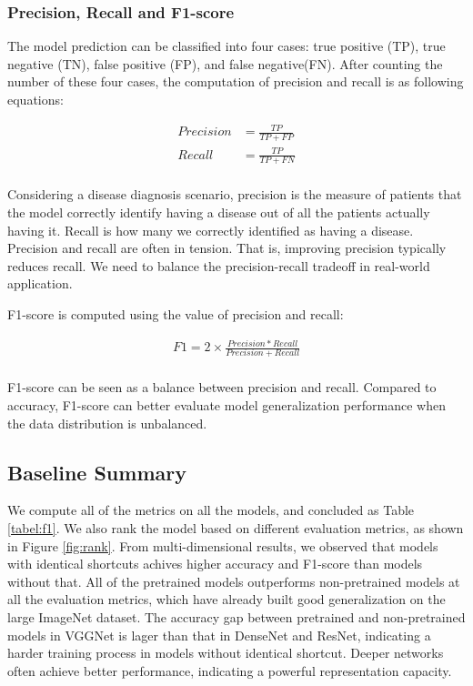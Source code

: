 \subsubsection{Precision, Recall and F1-score}
The model prediction can be classified into four cases: true positive (TP), true negative (TN), false positive (FP), and false negative(FN). After counting the number of these four cases, the computation of precision and recall is as following equations:


\begin{equation*}
  \begin{split}
    Precision & = \frac{TP}{TP+FP}\\
    Recall & = \frac{TP}{TP+FN}\\
  \end{split}
\end{equation*}

Considering a disease diagnosis scenario, precision is the measure of patients that the model correctly identify having a disease out of all the patients actually having it. Recall is how many we correctly identified as having a disease. Precision and recall are often in tension. That is, improving precision typically reduces recall. We need to balance the precision-recall tradeoff in real-world application.

F1-score is computed using the value of precision and recall:


\begin{equation*}
  \begin{split}
    F1 =2\times \frac{Precision  *Recall}{Precision + Recall}\\
  \end{split}
\end{equation*}

F1-score can be seen as a balance between precision and recall. Compared to accuracy, F1-score can better evaluate model generalization performance when the data distribution is unbalanced.

\subsection{Baseline Summary}
We compute all of the metrics on all the models, and concluded as Table \ref{tabel:f1}. We also rank the model based on different evaluation metrics, as shown in Figure \ref{fig:rank}. From multi-dimensional results, we observed that models with identical shortcuts achives higher accuracy and F1-score than models without that. All of the pretrained models outperforms non-pretrained models at all the evaluation metrics, which have already built good generalization on the large ImageNet dataset. The accuracy gap between pretrained and non-pretrained models in VGGNet is lager than that in DenseNet and ResNet, indicating a harder training process in models without identical shortcut. Deeper networks often achieve better performance, indicating a powerful representation capacity.

